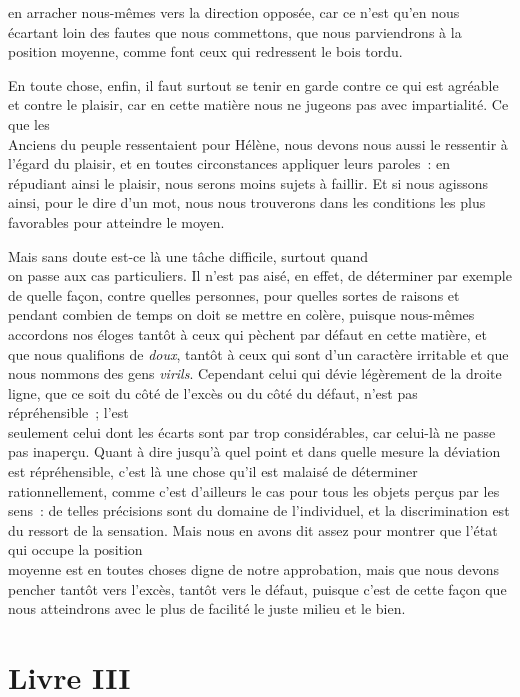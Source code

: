 \documentclass[french,twoside]{book} %
\begin{document}
en arracher nous-mêmes vers la direction opposée, car ce n’est qu’en nous écartant loin des fautes que nous commettons, que nous parviendrons à la position moyenne, comme font ceux qui redressent le bois tordu.\par
En toute chose, enfin, il faut surtout se tenir en garde contre ce qui est agréable et contre le plaisir, car en cette matière nous ne jugeons pas avec impartialité. Ce que les \\
Anciens du peuple ressentaient pour Hélène, nous devons nous aussi le ressentir à l’égard du plaisir, et en toutes circonstances appliquer leurs paroles : en répudiant ainsi le plaisir, nous serons moins sujets à faillir. Et si nous agissons ainsi, pour le dire d’un mot, nous nous trouverons dans les conditions les plus favorables pour atteindre le moyen.\par
Mais sans doute est-ce là une tâche difficile, surtout quand \\
on passe aux cas particuliers. Il n’est pas aisé, en effet, de déterminer par exemple de quelle façon, contre quelles personnes, pour quelles sortes de raisons et pendant combien de temps on doit se mettre en colère, puisque nous-mêmes accordons nos éloges tantôt à ceux qui pèchent par défaut en cette matière, et que nous qualifions de {\itshape doux}, tantôt à ceux qui sont d’un caractère irritable et que nous nommons des gens {\itshape virils}. Cependant celui qui dévie légèrement de la droite ligne, que ce soit du côté de l’excès ou du côté du défaut, n’est pas répréhensible ; l’est \\
seulement celui dont les écarts sont par trop considérables, car celui-là ne passe pas inaperçu. Quant à dire jusqu’à quel point et dans quelle mesure la déviation est répréhensible, c’est là une chose qu’il est malaisé de déterminer rationnellement, comme c’est d’ailleurs le cas pour tous les objets perçus par les sens : de telles précisions sont du domaine de l’individuel, et la discrimination est du ressort de la sensation. Mais nous en avons dit assez pour montrer que l’état qui occupe la position \\
moyenne est en toutes choses digne de notre approbation, mais que nous devons pencher tantôt vers l’excès, tantôt vers le défaut, puisque c’est de cette façon que nous atteindrons avec le plus de facilité le juste milieu et le bien.
\section[{Livre III}]{Livre III}\renewcommand{\leftmark}{Livre III}
\end{document}
